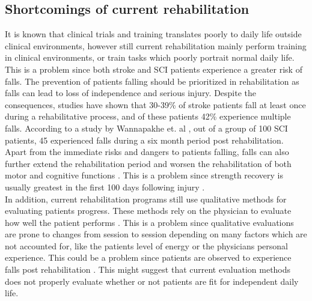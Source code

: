 
\subsection{Shortcomings of current rehabilitation}

It is known that clinical trials and training translates poorly to daily life outside clinical environments, however still current rehabilitation mainly perform training in clinical environments, or train tasks which poorly portrait normal daily life. \cite{Basteris2014}
This is a problem since both stroke and SCI patients experience a greater risk of falls. The prevention of patients falling should be prioritized in rehabilitation as falls can lead to loss of independence and serious injury. Despite the consequences, studies have shown that 30-39\% of stroke patients fall at least once during a rehabilitative process, and of these patients 42\% experience multiple falls. \cite{Bhalla2016, Hanger2014} According to a study by Wannapakhe et. al \cite{Wannapakhe2015}, out of a group of 100 SCI patients, 45 experienced falls during a six month period post rehabilitation. %
Apart from the immediate risks and dangers to patients falling, falls can also further extend the rehabilitation period and worsen the rehabilitation of both motor and cognitive functions \cite{Wong2016, Blennerhassett2012}. This is a problem since strength recovery is usually greatest in the first 100 days following injury \cite{Weidner2017}. \\

In addition, current rehabilitation programs still use qualitative methods for evaluating patients progress. These methods rely on the physician to evaluate how well the patient performs \cite{ANPT_SCI2018, ANPT_Stroke2018}. This is a problem since qualitative evaluations are prone to changes from session to session depending on many factors which are not accounted for, like the patients level of energy or the physicians personal experience. This could be a problem since patients are observed to experience falls post rehabilitation \cite{Bhalla2016, Hanger2014, Wannapakhe2015}. This might suggest that current evaluation methods does not properly evaluate whether or not patients are fit for independent daily life. 




